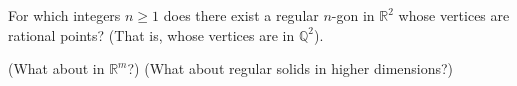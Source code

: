 For which integers $n \geq 1$
does there exist a regular $n$-gon in $\mathbb{R}^2$
whose vertices are rational points?
(That is, whose vertices are in $\mathbb{Q}^2$).

(What about in $\mathbb{R}^m$?)
(What about regular solids in higher dimensions?)
